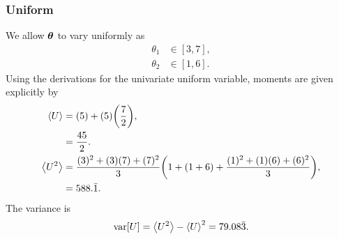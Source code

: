 \subsubsection{Uniform}
We allow $\vb*{\theta}$ to vary uniformly as
\begin{align}
\theta_1 &\in[3,7],\\
\theta_2 &\in[1,6].
\end{align}
Using the derivations for the univariate uniform variable, moments are given explicitly by
\begin{align}
\ev{U}&=(5)+(5)\qty(\frac{7}{2}), \\
  &= \frac{45}{2}.\\
\ev{U^2} &= \frac{(3)^2+(3)(7)+(7)^2}{3}\qty(1+(1+6)+\frac{(1)^2+(1)(6)+(6)^2}{3}),\\
  &= 588.\bar1.
\end{align}
The variance is
\begin{equation}
\text{var}[U]=\ev{U^2}-\ev{U}^2=79.08\bar3.
\end{equation}